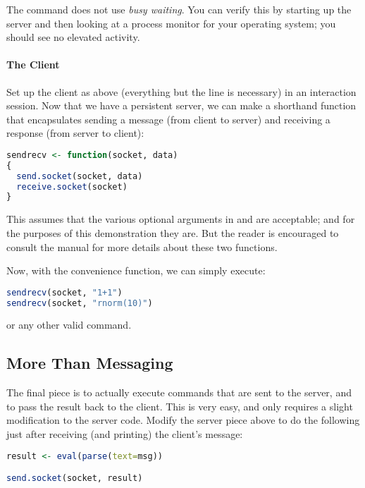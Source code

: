 The  command does not use \emph{busy waiting}.  You can
verify this by starting up the server and then looking at a process monitor for
your operating system; you should see no elevated activity.


\paragraph{The Client}

Set up the client as above (everything but the  line is
necessary) in an interaction  session.  Now that we have a 
persistent server, we can make a shorthand function that encapsulates
sending a message (from client to server) and receiving a response (from
server to client):

\begin{lstlisting}[language=R,title=Client Send/Receive]
sendrecv <- function(socket, data)
{
  send.socket(socket, data)
  receive.socket(socket)
}
\end{lstlisting}

This assumes that the various optional arguments in  and
 are acceptable; and for the purposes of this 
demonstration they are.  But the reader is encouraged to consult the
 manual for more details about these two functions.

Now, with the convenience function, we can simply execute:

\begin{lstlisting}[language=R,title=Client Usage]
sendrecv(socket, "1+1")
sendrecv(socket, "rnorm(10)")
\end{lstlisting}

or any other valid  command.




\subsection{More Than Messaging}\label{fullcs}


The final piece is to actually execute commands that are sent to the server,
and to pass the result back to the client.  This is very easy, and only 
requires a slight modification to the server code.  Modify the server piece
above to do the following just after receiving (and printing) the client's
message:

\begin{lstlisting}[language=R,title=Server Modification]
result <- eval(parse(text=msg))

send.socket(socket, result)
\end{lstlisting}

